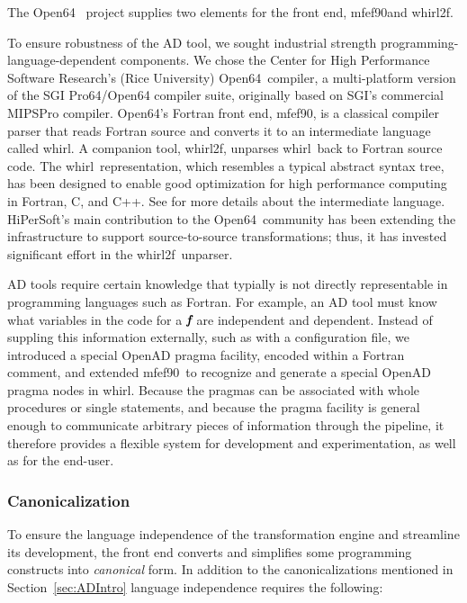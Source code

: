 \documentclass[acmtocl,acmnow]{acmtrans2m}
\newcommand{\mfefninety}{mfef90}
\newcommand{\OpenSixtyFour}{Open64}
\newcommand{\whirl}{whirl}
\newcommand{\whirlTof}{whirl2f}
\newcommand{\bmf}{\mbox{\bf\em f}}
\newcommand{\refsec}[1]{Section~\ref{#1}}
\begin{document}
The \OpenSixtyFour\ \cite{open64Web} project supplies two elements for
the front end, \mfefninety and \whirlTof.

To ensure robustness of the AD tool, we sought industrial strength
programming-language-dependent components.  We chose the Center for
High Performance Software Research's (Rice University) \OpenSixtyFour\
compiler, a multi-platform version of the SGI Pro64/Open64 compiler
suite, originally based on SGI's commercial MIPSPro compiler.
\OpenSixtyFour's Fortran front end, \mfefninety, is a classical
compiler parser that reads Fortran source and converts it to an
intermediate language called \whirl.  A companion tool, \whirlTof,
unparses \whirl\ back to Fortran source code.  The \whirl\
representation, which resembles a typical abstract syntax tree, has
been designed to enable good optimization for high performance
computing in Fortran, C, and C++. See \cite{whirl-stuff} for more
details about the intermediate language.  HiPerSoft's main
contribution to the \OpenSixtyFour\ community has been extending the
infrastructure to support source-to-source transformations; thus, it
has invested significant effort in the \whirlTof\ unparser.

AD tools require certain knowledge that typially is not directly
representable in programming languages such as Fortran.  For example,
an AD tool must know what variables in the code for a $\bmf$ are
independent and dependent.  Instead of suppling this information
externally, such as with a configuration file, we introduced a special
OpenAD pragma facility, encoded within a Fortran comment, and extended
\mfefninety\ to recognize and generate a special OpenAD pragma nodes
in \whirl.  Because the pragmas can be associated with whole
procedures or single statements, and because the pragma facility is
general enough to communicate arbitrary pieces of information through
the pipeline, it therefore provides a flexible system for development
and experimentation, as well as for the end-user.


\subsubsection{Canonicalization}\label{sssec:Canonicalization}

To ensure the language independence of the transformation engine and
streamline its development, the front end converts and simplifies some
programming constructs into \emph{canonical} form.  In addition to the
canonicalizations mentioned in \refsec{sec:ADIntro} language
independence requires the following:
\end{document}
